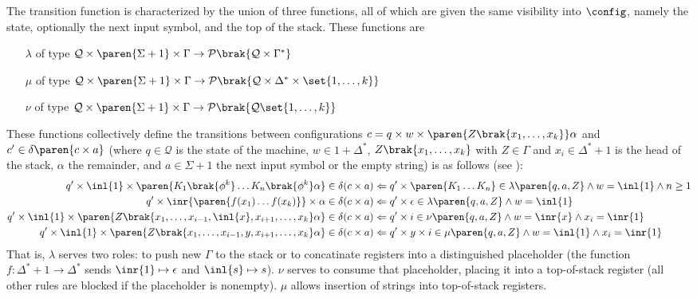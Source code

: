 The transition function is characterized by the union of three functions,
all of which are given the same visibility into $\config$, namely the state,
optionally the next input symbol, and the top of the stack.  These functions
are
%
\begin{itemize}
%
	\item[$\lambda$] of type $\mathcal{Q} \times \paren{\Sigma + 1} \times
	\Gamma \to \mathcal{P}\brak{ \mathcal{Q} \times \Gamma^* }$
%
	\item[$\mu$] of type $\mathcal{Q} \times \paren{\Sigma + 1} \times
	\Gamma \to \mathcal{P}\brak{ \mathcal{Q} \times \Delta^* \times
	\set{1,\ldots,k} }$
%
	\item[$\nu$] of type $\mathcal{Q} \times \paren{\Sigma + 1} \times
	\Gamma \to \mathcal{P}\brak{ \mathcal{Q} \set{1,\ldots,k} }$
%
\end{itemize}
%
These functions collectively define the transitions between configurations
$c = q \times w \times \paren{Z\brak{x_1,\ldots,x_k}}\alpha$ and $c' \in
\delta\paren{c \times a}$ (where $q \in \mathcal{Q}$ is the state of the
machine, $w \in 1 + \Delta^*$, $Z\brak{x_1,\ldots,x_k}$ with $Z \in \Gamma$
and $x_i \in \Delta^* + 1$ is the head of the stack, $\alpha$ the
remainder, and $a \in \Sigma + 1$ the next input symbol or the empty string)
is as follows (see \cite[p.  48]{aho:pa}):
%
\begin{align*}
	q'\times \inl{1} \times \paren{K_1\brak{\phi^k} \ldots K_n\brak{\phi^k} \alpha} \in\delta (c \times a)
%
	&\Leftarrow q' \times \paren{K_1 \ldots K_n} \in \lambda\paren{q,a, Z} \wedge w = \inl{1} \wedge n \ge 1 \\
%
	q'\times \inr{\paren{f(x_1) \ldots f(x_k)}} \times \alpha \in \delta (c \times a)
%
	&\Leftarrow q' \times \epsilon \in \lambda\paren{q,a, Z} \wedge w = \inl{1} \\
%
	q'\times \inl{1} \times \paren{Z\brak{x_1,\ldots,x_{i-1},\inl{x},x_{i+1},\ldots,x_k}\alpha} \in\delta (c \times a)
%
	&\Leftarrow q' \times i \in \nu\paren{q,a, Z} \wedge w = \inr{x} \wedge x_i = \inr{1} \\
%
	q'\times \inl{1} \times \paren{Z\brak{x_1,\ldots,x_{i-1},y,x_{i+1},\ldots,x_k}\alpha} \in\delta (c \times a)
%
	&\Leftarrow q' \times y \times i \in \mu\paren{q,a, Z} \wedge w = \inl{1} \wedge x_i = \inr{1} \\
%
\end{align*}
%
That is, $\lambda$ serves two roles: to push new $\Gamma$ to the stack or to
concatinate registers into a distinguished placeholder (the function $f :
\Delta^* + 1 \to \Delta^*$ sends $\inr{1} \mapsto \epsilon$ and $\inl{s}
\mapsto s$).  $\nu$ serves to consume that placeholder, placing it into a
top-of-stack register (all other rules are blocked if the placeholder is
nonempty).  $\mu$ allows insertion of strings into top-of-stack registers.
